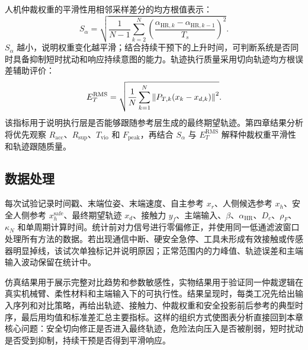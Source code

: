 人机仲裁权重的平滑性用相邻采样差分的均方根值表示：
\begin{equation}
  S_{\alpha}=
  \sqrt{
  \frac{1}{N-1}
  \sum_{k=2}^{N}
  \left(
  \frac{\alpha_{\mathrm{HR},k}-\alpha_{\mathrm{HR},k-1}}{T_s}
  \right)^2
  } .
  \label{eq:ch4_metric_alpha_smoothness}
\end{equation}
$S_{\alpha}$ 越小，说明权重变化越平滑；结合持续干预下的上升时间，可判断系统是否同时具备抑制短时扰动和响应持续意图的能力。轨迹执行质量采用切向轨迹均方根误差辅助评价：
\begin{equation}
  E_T^{\mathrm{RMS}}=
  \sqrt{
  \frac{1}{N}
  \sum_{k=1}^{N}
  \left\lVert P_{T,k}(x_k-x_{d,k})\right\rVert^2
  } .
  \label{eq:ch4_metric_tangent_error}
\end{equation}
该指标用于说明执行层是否能够跟随参考层生成的最终期望轨迹。第四章结果分析将优先观察 $R_{\mathrm{acc}}$、$R_{\mathrm{sup}}$、$T_{\mathrm{vio}}$ 和 $F_{\mathrm{peak}}$，再结合 $S_{\alpha}$ 与 $E_T^{\mathrm{RMS}}$ 解释仲裁权重平滑性和轨迹跟随质量。

\subsection{数据处理}
\label{subsec:ch4_data_processing}

每次试验记录时间戳、末端位姿、末端速度、自主参考 $x_r$、人侧候选参考 $x_h$、安全人侧参考 $x_h^{\mathrm{safe}}$、最终期望轨迹 $x_d$、接触力 $y_f$、主端输入、$\beta$、$\alpha_{\mathrm{HR}}$、$D_c$、$\rho_F$、$\kappa_N$ 和单周期计算时间。统计前对力信号进行零偏修正，并使用同一低通滤波窗口处理所有方法的数据。若出现通信中断、硬安全急停、工具未形成有效接触或传感器明显掉线，该试次单独标记并说明原因；正常范围内的力峰值、轨迹误差和主端输入波动保留在统计中。

仿真结果用于展示完整对比趋势和参数敏感性，实物结果用于验证同一仲裁逻辑在真实机械臂、柔性材料和主端输入下的可执行性。结果呈现时，每类工况先给出输入序列和对比策略，再给出轨迹、接触力、仲裁权重和安全投影前后参考的典型时序，最后用均值和标准差汇总主要指标。这样的组织方式使图表分析直接回到本章核心问题：安全切向修正是否进入最终轨迹，危险法向压入是否被削弱，短时扰动是否受到抑制，持续干预是否得到平滑响应。
